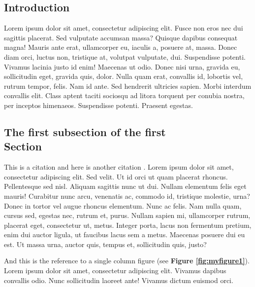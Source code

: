 \documentclass[a4paper,10pt]{article}
\begin{document}
\vspace{4ex}	%
\begin{multicols}{2}

\section{Introduction}

Lorem ipsum dolor sit amet, consectetur adipiscing elit.  Fusce non eros nec dui
sagittis placerat. Sed vulputate accumsan massa? Quisque dapibus consequat
magna! Mauris ante erat, ullamcorper eu, iaculis a, posuere at, massa. Donec
diam orci, luctus non, tristique at, volutpat vulputate, dui.  Suspendisse
potenti. Vivamus lacinia justo id enim! Maecenas ut odio. Donec nisi urna,
gravida eu, sollicitudin eget, gravida quis, dolor. Nulla quam erat, convallis
id, lobortis vel, rutrum tempor, felis. Nam id ante. Sed hendrerit ultricies
sapien. Morbi interdum convallis elit. Class aptent taciti sociosqu ad litora
torquent per conubia nostra, per inceptos himenaeos. Suspendisse potenti.
Praesent egestas.


\subsection{The first subsection of the first \\ Section}

This is a citation \cite{Norman09Learn} and here is another citation
\cite{Peyton93Howto}.  Lorem ipsum dolor sit amet, consectetur adipiscing elit.
Sed velit. Ut id orci ut quam placerat rhoncus. Pellentesque sed nisl. Aliquam
sagittis nunc ut dui.  Nullam elementum felis eget mauris! Curabitur nunc arcu,
venenatis ac, commodo id, tristique molestie, urna? Donec in tortor vel augue
rhoncus elementum. Nunc ac felis. Nam nulla quam, cursus sed, egestas nec,
rutrum et, purus. Nullam sapien mi, ullamcorper rutrum, placerat eget,
consectetur ut, metus. Integer porta, lacus non fermentum pretium, enim dui
auctor ligula, ut faucibus lacus sem a metus. Maecenas posuere dui eu est. Ut
massa urna, auctor quis, tempus et, sollicitudin quis, justo?


And this is the reference to a single column figure (see {\bf Figure
\ref{fig:myfigure1}}).  Lorem ipsum dolor sit amet, consectetur adipiscing elit.
Vivamus dapibus convallis odio. Nunc sollicitudin laoreet ante! Vivamus dictum
euismod orci.


\end{multicols}
\end{document}
